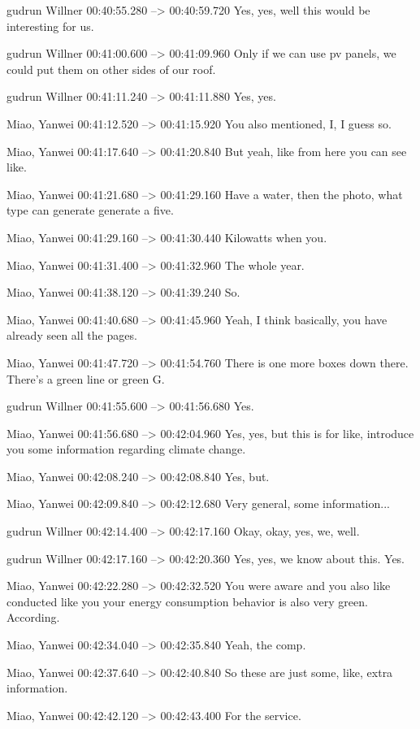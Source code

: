 {gudrun Willner 00:40:55.280 --> 00:40:59.720
Yes, yes, well this would be interesting for us.

gudrun Willner 00:41:00.600 --> 00:41:09.960
Only if we can use pv panels, we could put them on other sides of our roof.

gudrun Willner 00:41:11.240 --> 00:41:11.880
Yes, yes.

Miao, Yanwei 00:41:12.520 --> 00:41:15.920
You also mentioned, I, I guess so.

Miao, Yanwei 00:41:17.640 --> 00:41:20.840
But yeah, like from here you can see like.

Miao, Yanwei 00:41:21.680 --> 00:41:29.160
Have a water, then the photo, what type can generate generate a five.

Miao, Yanwei 00:41:29.160 --> 00:41:30.440
Kilowatts when you.

Miao, Yanwei 00:41:31.400 --> 00:41:32.960
The whole year.

Miao, Yanwei 00:41:38.120 --> 00:41:39.240
So.

Miao, Yanwei 00:41:40.680 --> 00:41:45.960
Yeah, I think basically, you have already seen all the pages.

Miao, Yanwei 00:41:47.720 --> 00:41:54.760
There is one more boxes down there. There's a green line or green G.

gudrun Willner 00:41:55.600 --> 00:41:56.680
Yes.

Miao, Yanwei 00:41:56.680 --> 00:42:04.960
Yes, yes, but this is for like, introduce you some information regarding climate change.

Miao, Yanwei 00:42:08.240 --> 00:42:08.840
Yes, but.

Miao, Yanwei 00:42:09.840 --> 00:42:12.680
Very general, some information...

gudrun Willner 00:42:14.400 --> 00:42:17.160
Okay, okay, yes, we, well.

gudrun Willner 00:42:17.160 --> 00:42:20.360
Yes, yes, we know about this. Yes.

Miao, Yanwei 00:42:22.280 --> 00:42:32.520
You were aware and you also like conducted like you your energy consumption behavior is also very green. According.

Miao, Yanwei 00:42:34.040 --> 00:42:35.840
Yeah, the comp.

Miao, Yanwei 00:42:37.640 --> 00:42:40.840
So these are just some, like, extra information.

Miao, Yanwei 00:42:42.120 --> 00:42:43.400
For the service.

}
